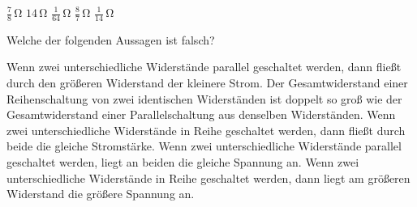\documentclass[11pt]{exam}
\begin{document}
\begin{questions}
\begin{choices}
	\choice \(\mathrm{\frac{7}{8}\,\Omega}\)
	\choice \(\mathrm{14\,\Omega}\)
	\choice \(\mathrm{\frac{1}{64}\,\Omega}\)
	\choice \(\mathrm{\frac{8}{7}\,\Omega}\)
	\choice \(\mathrm{\frac{1}{14}\,\Omega}\)
\end{choices}

\vspace{3mm}\question Welche der folgenden Aussagen ist falsch?

\begin{choices}
	\choice Wenn zwei unterschiedliche Widerstände parallel geschaltet werden, dann fließt durch den größeren Widerstand der kleinere Strom.
	\choice Der Gesamtwiderstand einer Reihenschaltung von zwei identischen Widerständen ist doppelt so groß wie der Gesamtwiderstand einer Parallelschaltung aus denselben Widerständen.
	\choice Wenn zwei unterschiedliche Widerstände in Reihe geschaltet werden, dann fließt durch beide die gleiche Stromstärke.
	\choice Wenn zwei unterschiedliche Widerstände parallel geschaltet werden, liegt an beiden die gleiche Spannung an.
	\choice Wenn zwei unterschiedliche Widerstände in Reihe geschaltet werden, dann liegt am größeren Widerstand die größere Spannung an.
\end{choices}

\vspace{3mm}\end{questions}
\end{document}
